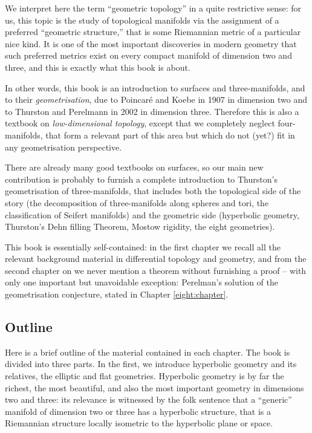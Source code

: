 \documentclass [11pt]{amsbook}
\theoremstyle{definition}
\theoremstyle{remark}
\numberwithin{section}{chapter}  %
\numberwithin{subsection}{section}  %
\numberwithin{figure}{chapter}
\numberwithin{table}{chapter}
\begin{document}
We interpret here the term ``geometric topology'' in a quite restrictive sense: for us, this topic is the study of topological manifolds via the assignment of a preferred ``geometric structure,'' that is some Riemannian metric of a particular nice kind. It is one of the most important discoveries in modern geometry that such preferred metrics exist on every compact manifold of dimension two and three, and this is exactly what this book is about. 

In other words, this book is an introduction to surfaces and three-manifolds, and to their \emph{geometrisation}, due to Poincar\'e and Koebe in 1907 in dimension two and to Thurston and Perelmann in 2002 in dimension three. Therefore this is also a textbook on \emph{low-dimensional topology}, except that we completely neglect four-manifolds, that form a relevant part of this area but which do not (yet?) fit in any geometrisation perspective.

There are already many good textbooks on surfaces, so our main new contribution is probably to furnish a complete introduction to Thurston's geometrisation of three-manifolds, that includes both the topological side of the story (the decomposition of three-manifolds along spheres and tori, the classification of Seifert manifolds) and the geometric side (hyperbolic geometry, Thurston's Dehn filling Theorem, Mostow rigidity, the eight geometries). 

This book is essentially self-contained: in the first chapter we recall all the relevant background material in differential topology and geometry, and from the second chapter on we never mention a theorem without furnishing a proof -- with only one important but unavoidable exception: Perelman's solution of the geometrisation conjecture, stated in Chapter \ref{eight:chapter}. 

\subsection*{Outline}
Here is a brief outline of the material contained in each chapter.
The book is divided into three parts. In the first, we introduce hyperbolic geometry and its relatives, the elliptic and flat geometries. Hyperbolic geometry is by far the richest, the most beautiful, and also the most important geometry in dimensions two and three: its relevance is witnessed by the folk sentence that a ``generic'' manifold of dimension two or three has a hyperbolic structure, that is a Riemannian structure locally isometric to the hyperbolic plane or space.
\end{document}
